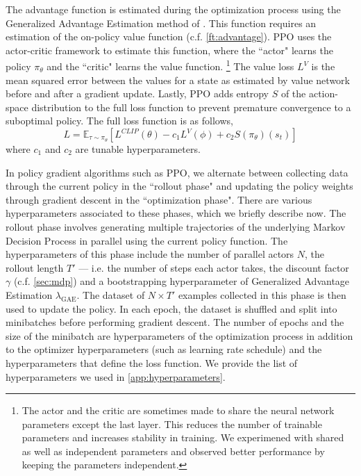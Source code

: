 The advantage function is estimated during the optimization process using the Generalized Advantage Estimation method of 
\cite{schulman2018highdimensional}. 
This function requires an estimation of the on-policy value function (c.f. \autoref{ft:advantage}). PPO uses the actor-critic framework to estimate this function, where the ``actor" learns the policy $\pi_\theta$ and the ``critic" learns the value function.
\footnote{
The actor and the critic are sometimes made to share the neural network parameters except the last layer. This reduces the number of trainable parameters and increases stability in training. We experimened with shared as well as independent parameters and observed better performance by keeping the parameters independent.
}
The value loss $L^V$ is the mean squared error between the values for a state as estimated by value network before and after a gradient update.
Lastly, PPO adds entropy $S$ of the action-space distribution to the full loss function to prevent premature convergence to a suboptimal policy. The full loss function is as follows,
\[
L = \mathbb{E}_{\tau \sim \pi_\theta} [L^{CLIP}(\theta) - c_1 L^{V}(\phi) + c_2 S(\pi_\theta)(s_t)]
\]
where $c_1$ and $c_2$ are tunable hyperparameters.
\newline 

In policy gradient algorithms such as PPO, we alternate between collecting data through the current policy in the ``rollout phase" and updating the policy weights through gradient descent in the ``optimization phase". There are various hyperparameters associated to these phases, which we briefly describe now. The rollout phase involves generating multiple trajectories of the underlying Markov Decision Process in parallel using the current policy function. The hyperparameters of this phase include the number of parallel actors $N$, the rollout length $T'$ --- i.e. the number of steps each actor takes, the discount factor $\gamma$ (c.f. \autoref{sec:mdp}) and a bootstrapping hyperparameter of Generalized Advantage Estimation $\lambda_{\text{GAE}}$. The dataset of $N \times T'$ examples collected in this phase is then used to update the policy. In each epoch, the dataset is shuffled and split into minibatches before performing gradient descent. The number of epochs and the size of the minibatch are hyperparameters of the optimization process in addition to the optimizer hyperparameters (such as learning rate schedule) and the hyperparameters that define the loss function. We provide the list of hyperparameters we used in  \autoref{app:hyperparameters}.


